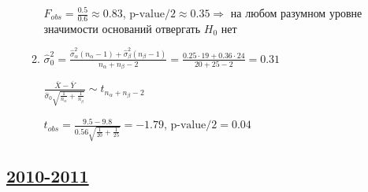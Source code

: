 \begin{enumerate}
\begin{enumerate}
$F_{obs} = \frac{0.5}{0.6} \approx 0.83$, $\text{p-value}/ 2\approx 0.35 \Rightarrow$ на любом разумном уровне значимости оснований отвергать $H_0$ нет
\item $\hat{\sigma}_0^2 = \frac{\hat{\sigma}_\alpha^2(n_\alpha -1) + \hat{\sigma}_\beta^2(n_\beta-1)}{n_\alpha+n_\beta-2} = \frac{0.25\cdot19 + 0.36\cdot24}{20+25-2}=0.31$

$\frac{\bar{X} - \overline{Y}}{\hat{\sigma}_0 \sqrt{\frac{1}{n_\alpha}+\frac{1}{n_\beta}}} \sim t_{n_\alpha+n_\beta-2}$

$t_{obs} = \frac{9.5-9.8}{0.56\sqrt{\frac{1}{20}+ \frac{1}{25}}} = -1.79$, $\text{p-value}/2=0.04$

\end{enumerate}
\end{enumerate}


\subsection[2010-2011]{\hyperref[sec:kr_03_2010_2011]{2010-2011}}
\label{sec:sol_kr_03_2010_2011}



